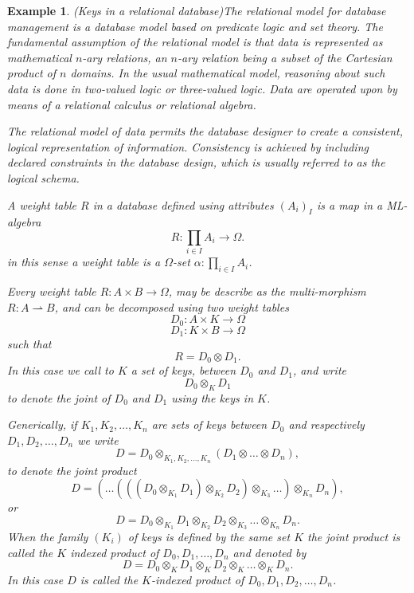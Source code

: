 \documentclass[oribibl]{llncs}
\newtheorem{exam}{Example}
\begin{document}
\begin{exam}(Keys in a relational database)\label{def:indexproduct}
The relational model for database management is a database model based on predicate logic and set theory. The fundamental assumption of the relational model is that data is represented as mathematical $n$-ary relations, an $n$-ary relation being a subset of the Cartesian product of $n$ domains. In the usual mathematical model, reasoning about such data is done in two-valued logic or three-valued logic. Data are operated upon by means of a relational calculus or relational algebra.

The relational model of data permits the database designer to create a consistent, logical representation of information. Consistency is achieved by including declared constraints in the database design, which is usually referred to as the logical schema.


A weight table $R$ in a database defined using attributes $(A_i)_I$ is a map in a ML-algebra
\[
R:\prod_{i\in I}A_i\rightarrow\Omega.
\]
in this sense a weight table is a $\Omega$-set $\alpha:\prod_{i\in I}A_i$.

Every weight table $R:A\times B\rightarrow\Omega$, may be describe as the multi-morphism $R:A\rightharpoonup B$, and can be decomposed using two weight tables
\[
D_0:A\times K\rightarrow\Omega
\]
\[
D_1:K\times B\rightarrow\Omega
\]
such that
\[
R=D_0\otimes D_1.
\]
In this case we call to $K$ a set of \emph{keys}, between $D_0$ and $D_1$, and write
\[D_0\otimes_KD_1\]
to denote the joint of $D_0$ and $D_1$ using the keys in $K$.

Generically, if $K_1,K_2,\ldots,K_n$ are sets of keys between $D_0$ and respectively $D_1,D_2,\ldots,D_n$ we write
\[
D=D_0\otimes_{K_1,K_2,\ldots,K_n}(D_1\otimes\ldots\otimes D_n),
\]
to denote the joint product
\[
D=(\ldots(((D_0\otimes_{K_1}D_1)\otimes_{K_2}D_2)\otimes_{K_3}\ldots)\otimes_{K_n}D_n),
\]
or
\[
D=D_0\otimes_{K_1}D_1\otimes_{K_2}D_2\otimes_{K_3}\ldots\otimes_{K_n}D_n.
\]
When the family $(K_i)$ of keys is defined by the same set $K$ the joint product is called the $K$ indexed product of $D_0,D_1,\ldots,D_n$ and denoted by
\[D=D_0\otimes_{K}D_1\otimes_{K}D_2\otimes_{K}\ldots\otimes_{K}D_n.\]
In this case $D$ is called the $K$-\emph{indexed product} of $D_0,D_1,D_2,\ldots,D_n$.
\end{exam}
\end{document}
